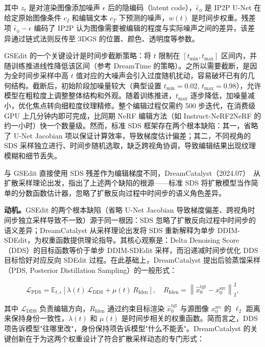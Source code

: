 其中 $z_t$ 是对渲染图像添加噪声 $\epsilon$ 后的隐编码（latent code），$\hat{\epsilon}_\phi$ 是 IP2P U-Net 在给定原始图像条件 $c_I$ 和编辑文本 $c_T$ 下预测的噪声，$w(t)$ 是时间步权重。残差项 $\hat{\epsilon}_\phi - \epsilon$ 编码了 IP2P 认为图像需要被编辑的程度与实际噪声之间的差异，该差异通过链式法则反传至 3DGS 的位置、颜色、透明度等参数。

GSEdit 的一个关键设计是时间步截断策略：将 $t$ 限制在 $[t_{\min}, t_{\max}]$ 区间内，并随训练推进线性降低该区间（参考 DreamTime 的策略）。之所以需要截断，是因为全时间步采样中高 $t$ 值对应的大噪声会引入过度随机扰动，容易破坏已有的几何结构。截断后，初始阶段加噪量较大（典型设置 $t_{\min}=0.02$, $t_{\max}=0.98$），允许模型在粗粒度上调整整体结构和外观。随着训练推进，$t_{\max}$ 逐步降低，加噪量减小，优化焦点转向细粒度纹理精修。整个编辑过程仅需约 500 步迭代，在消费级 GPU 上几分钟内即可完成，比同期 NeRF 编辑方法（如 Instruct-NeRF2NeRF 的约一小时）快一个数量级。然而，标准 SDS 框架存在两个根本缺陷：其一，省略了 U-Net Jacobian 项以保证计算效率，导致梯度估计偏差；其二，不同视角的 SDS 采样独立进行、时间步随机选取，缺乏跨视角协调，导致编辑结果出现纹理模糊和细节丢失。

与 GSEdit 直接使用 SDS 残差作为编辑梯度不同，DreamCatalyst（2024.07）~\cite{2407_11394}从扩散采样理论出发，指出了上述两个缺陷的根源——标准 SDS 将扩散模型当作简单的分数函数估计器，忽略了扩散反向过程中时间步的语义角色差异。

\textbf{动机。}GSEdit 的两个根本缺陷（省略 U-Net Jacobian 导致梯度偏差、跨视角时间步独立采样导致不一致）源于同一根因：SDS 忽略了扩散反向过程中时间步的语义差异；DreamCatalyst 从采样理论出发将 SDS 重新解释为单步 DDIM-SDEdit，为权重函数提供理论指导。其核心观察是：Delta Denoising Score（DDS）的目标函数等价于单步 DDIM-SDEdit 采样，而沿递减时间步优化 DDS 目标恰好对应反向 SDEdit 过程。在此基础上，DreamCatalyst 提出后验蒸馏采样（PDS, Posterior Distillation Sampling）的一般形式：

\begin{equation}
  \mathcal{L}_{\text{PDS}} = \mathbb{E}_{t,\epsilon} \left[ \lambda(t) \, \mathcal{L}_{\text{DDS}} + \mu(t) \, R_{\text{Iden}} \right], \quad R_{\text{Iden}} = \left\| \hat{x}_0^{\text{tgt}} - x_0^{\text{src}} \right\|_2^2,
\end{equation}

其中 $\mathcal{L}_{\text{DDS}}$ 负责编辑方向，$R_{\text{Iden}}$ 通过约束目标渲染 $\hat{x}_0^{\text{tgt}}$ 与源图像 $x_0^{\text{src}}$ 的 $\ell_2$ 距离来保持身份一致性，$\lambda(t)$ 和 $\mu(t)$ 是时间步相关的权重函数。简而言之，DDS 项告诉模型"往哪里改"，身份保持项告诉模型"什么不能丢"。DreamCatalyst 的关键创新在于为这两个权重设计了符合扩散采样动态的专门形式：

